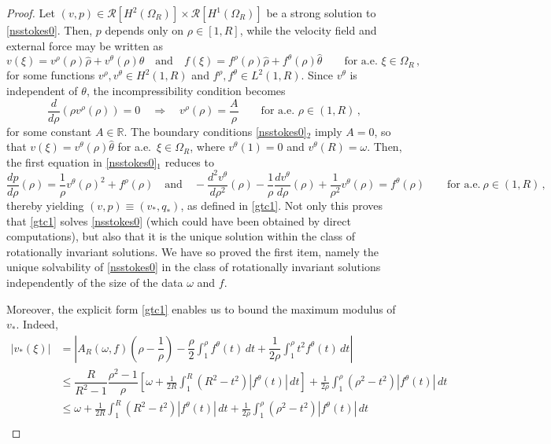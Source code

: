 \documentclass[a4paper,11pt]{article}
\numberwithin{equation}{section}
\numberwithin{figure}{section}
\begin{document}
\begin{proof} Let $(v,p) \in \mathcal{R}[H^{2}(\Omega_{R})] \times \mathcal{R}[H^{1}(\Omega_{R})]$ be a strong solution to \eqref{nsstokes0}.
Then, $p$ depends only on $\rho \in [1,R]$, while the velocity field and external force may be written as
$$
v(\xi) = v^{\rho}(\rho) \widehat{\rho} + v^{\theta}(\rho) \widehat{\theta} \quad \text{and} \quad f(\xi) = f^{\rho}(\rho) \widehat{\rho} +
f^{\theta}(\rho) \widehat{\theta} \qquad \text{for a.e. }\xi \in \Omega_{R} \, ,
$$
for some functions $v^{\rho}, v^{\theta}  \in H^{2}(1,R)$ and $f^{\rho}, f^{\theta}  \in L^{2}(1,R)$. Since $v^\theta$
is independent
of $\theta$, the incompressibility condition becomes
$$
\dfrac{d}{d\rho}(\rho v^{\rho}(\rho))=0\quad \Longrightarrow \quad v^{\rho}(\rho) = \dfrac{A}{\rho} \qquad\text{for a.e. }\rho\in(1,R) \, ,
$$
for some constant $A \in \mathbb{R}$. The boundary conditions \eqref{nsstokes0}$_2$ imply $A=0$, so that $v(\xi) = v^{\theta}(\rho)
\widehat{\theta}$ for a.e.\
$\xi \in \Omega_{R}$, where $v^{\theta}(1) = 0$ and $v^{\theta}(R) = \omega$. Then, the first equation in \eqref{nsstokes0}$_1$ reduces to
$$
\frac{d p}{d \rho}(\rho) = \dfrac{1}{\rho} v^{\theta}(\rho)^{2} + f^{\rho}(\rho) \quad \text{and} \quad -\dfrac{d^2 v^{\theta}}{d\rho^2}(\rho) -
\frac{1}{\rho} \dfrac{d v^{\theta}}{d\rho}(\rho) + \dfrac{1}{\rho^{2}} v^{\theta}(\rho) = f^{\theta}(\rho) \qquad \text{for a.e.} \ \rho \in (1,R)
\, ,
$$
thereby yielding $(v,p)\equiv(v_{*},q_{*})$, as defined in \eqref{gtc1}. Not only this proves that \eqref{gtc1} solves \eqref{nsstokes0}
(which could have been obtained by direct computations), but also that it is the unique solution within the class of rotationally
invariant solutions. We have so proved the first item, namely the unique solvability of \eqref{nsstokes0} in the class of rotationally
invariant solutions independently of the size of the data $\omega$ and $f$.
\par
Moreover, the explicit form \eqref{gtc1} enables us to bound the maximum modulus of $v_{*}$. Indeed,
$$
\begin{aligned}
|v_{*}(\xi)| &= \left|A_{R}(\omega,f) \left(\rho-\dfrac{1}{\rho}\right)-\dfrac{\rho}{2} \int_{1}^{\rho} f^{\theta}(t) \, dt + \dfrac{1}{2\rho}
\int_{1}^{\rho} t^{2} f^{\theta}(t) \, dt\right|\\[6pt]
 &\le \dfrac{R}{R^2-1}\dfrac{\rho^2-1}{\rho}\left[\omega+\frac{1}{2R}\int_{1}^{R}(R^2-t^2)|f^{\theta}(t)|\, dt\right]
+\frac1{2\rho} \int_{1}^{\rho}(\rho^2-t^2)|f^{\theta}(t)|\, dt\\[6pt]
   &\le \omega+\frac{1}{2R}\int_{1}^{R}(R^2-t^2)|f^{\theta}(t)|\, dt+\frac1{2\rho} \int_{1}^{\rho}(\rho^2-t^2)|f^{\theta}(t)|\, dt\\[6pt]

\end{aligned}$$
\end{proof}
\end{document}
